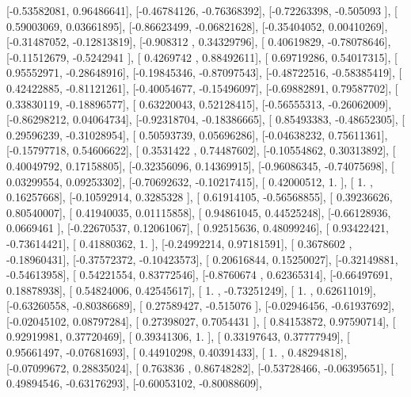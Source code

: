 \documentclass{article}
\begin{document}
       [-0.53582081,  0.96486641],
       [-0.46784126, -0.76368392],
       [-0.72263398, -0.505093  ],
       [ 0.59003069,  0.03661895],
       [-0.86623499, -0.06821628],
       [-0.35404052,  0.00410269],
       [-0.31487052, -0.12813819],
       [-0.908312  ,  0.34329796],
       [ 0.40619829, -0.78078646],
       [-0.11512679, -0.5242941 ],
       [ 0.4269742 ,  0.88492611],
       [ 0.69719286,  0.54017315],
       [ 0.95552971, -0.28648916],
       [-0.19845346, -0.87097543],
       [-0.48722516, -0.58385419],
       [ 0.42422885, -0.81121261],
       [-0.40054677, -0.15496097],
       [-0.69882891,  0.79587702],
       [ 0.33830119, -0.18896577],
       [ 0.63220043,  0.52128415],
       [-0.56555313, -0.26062009],
       [-0.86298212,  0.04064734],
       [-0.92318704, -0.18386665],
       [ 0.85493383, -0.48652305],
       [ 0.29596239, -0.31028954],
       [ 0.50593739,  0.05696286],
       [-0.04638232,  0.75611361],
       [-0.15797718,  0.54606622],
       [ 0.3531422 ,  0.74487602],
       [-0.10554862,  0.30313892],
       [ 0.40049792,  0.17158805],
       [-0.32356096,  0.14369915],
       [-0.96086345, -0.74075698],
       [ 0.03299554,  0.09253302],
       [-0.70692632, -0.10217415],
       [ 0.42000512,  1.        ],
       [ 1.        ,  0.16257668],
       [-0.10592914,  0.3285328 ],
       [ 0.61914105, -0.56568855],
       [ 0.39236626,  0.80540007],
       [ 0.41940035,  0.01115858],
       [ 0.94861045,  0.44525248],
       [-0.66128936,  0.0669461 ],
       [-0.22670537,  0.12061067],
       [ 0.92515636,  0.48099246],
       [ 0.93422421, -0.73614421],
       [ 0.41880362,  1.        ],
       [-0.24992214,  0.97181591],
       [ 0.3678602 , -0.18960431],
       [-0.37572372, -0.10423573],
       [ 0.20616844,  0.15250027],
       [-0.32149881, -0.54613958],
       [ 0.54221554,  0.83772546],
       [-0.8760674 ,  0.62365314],
       [-0.66497691,  0.18878938],
       [ 0.54824006,  0.42545617],
       [ 1.        , -0.73251249],
       [ 1.        ,  0.62611019],
       [-0.63260558, -0.80386689],
       [ 0.27589427, -0.515076  ],
       [-0.02946456, -0.61937692],
       [-0.02045102,  0.08797284],
       [ 0.27398027,  0.7054431 ],
       [ 0.84153872,  0.97590714],
       [ 0.92919981,  0.37720469],
       [ 0.39341306,  1.        ],
       [ 0.33197643,  0.37777949],
       [ 0.95661497, -0.07681693],
       [ 0.44910298,  0.40391433],
       [ 1.        ,  0.48294818],
       [-0.07099672,  0.28835024],
       [ 0.763836  ,  0.86748282],
       [-0.53728466, -0.06395651],
       [ 0.49894546, -0.63176293],
       [-0.60053102, -0.80088609],
\end{document}
